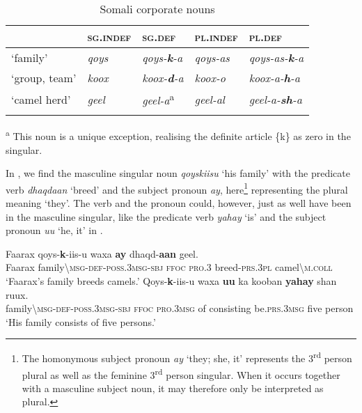 \documentclass[output=paper]{langsci/langscibook}
\begin{document}
\begin{table}
\caption{Somali corporate nouns}
\label{tab:nilsson:14}
\begin{tabularx}{\textwidth}{XlXlX}
\lsptoprule
& {\textsc{sg.indef}}  & {\textsc{sg.def}} & {\textsc{pl.indef}} & {\textsc{pl.def}}\\
\midrule 
{‘family’} & {\textit{qoys}} &  {\textit{qoys-}\textbf{\textit{k}}\textit{-a}} & {\textit{qoys-as}} & {\textit{qoys-as-}\textbf{\textit{k}}\textit{-a}}\\
{‘group, team’} & {\textit{koox}} &  {\textit{koox-}\textbf{\textit{d}}\textit{-a}} & {\textit{koox-o}} & {\textit{koox-a-}\textbf{\textit{h}}\textit{-a}}\\
{‘camel herd’} & {\textit{geel}} &  {\textit{geel-a}\textsuperscript{a}} & {\textit{geel-al}} & {\textit{geel-a-}\textbf{\textit{sh}}\textit{-a}}\\
\lspbottomrule
\end{tabularx}

\end{table} 


\textsuperscript{a} This noun is a unique exception, realising the definite article \{k\} as zero in the singular.

In , we find the masculine singular noun \textit{qoyskiisu} ‘his family’ with the predicate verb \textit{dhaqdaan} ‘breed’ and the subject pronoun \textit{ay}, here\footnote{The homonymous subject pronoun \textit{ay} ‘they; she, it’ represents the 3\textsuperscript{rd} person plural as well as the feminine 3\textsuperscript{rd} person singular. When it occurs together with a masculine subject noun, it may therefore only be interpreted as plural.} representing the plural meaning ‘they’. The verb and the pronoun could, however, just as well have been in the masculine singular, like the predicate verb \textit{yahay} ‘is’ and the subject pronoun \textit{uu} ‘he, it’ in .

\ea\label{ex:nilsson:8}
\gll Faarax  qoys-\textbf{k}-iis-u        waxa  \textbf{ay}    dhaqd-\textbf{aan}  geel.\\
     Faarax  family{\textbackslash}\textsc{msg-def-poss.3msg-sbj}    \textsc{ffoc}  \textsc{pro.3}  breed-\textsc{prs.3pl}  camel{\textbackslash}\textsc{m.coll}\\
\glt ‘Faarax’s family breeds camels.’
\z 
\ea\label{ex:nilsson:9}
\gll Qoys-\textbf{k}-iis-u      waxa  \textbf{uu}    ka  kooban    \textbf{yahay}    shan  ruux.\\
     family{\textbackslash}\textsc{msg-def-poss.3msg-sbj}  \textsc{ffoc}  \textsc{pro.3msg}  of  consisting  be.\textsc{prs.3msg}  five  person\\
\glt ‘His family consists of five persons.’
\z
\end{document}
